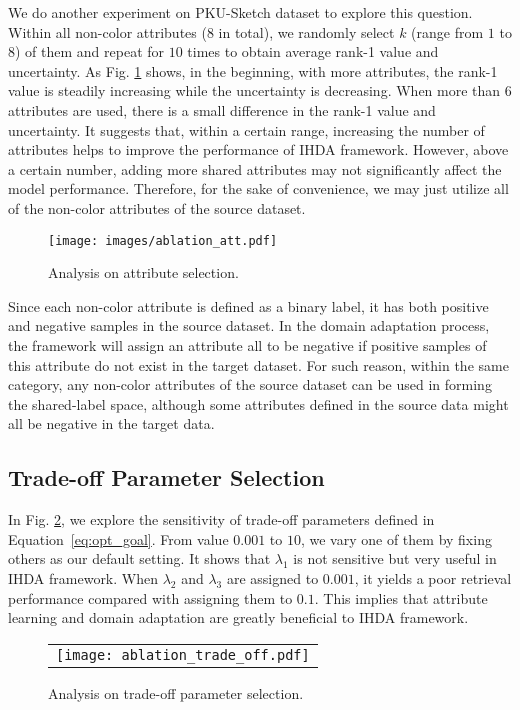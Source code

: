 \documentclass[journal]{IEEEtran}
\begin{document}
We do another experiment on PKU-Sketch dataset to explore this question. Within all non-color attributes ($8$ in total), we randomly select $k$ (range from $1$ to $8$) of them and repeat for $10$ times to obtain average rank-1 value and uncertainty. As Fig. \ref{fig:ablation_att} shows, 
in the beginning, with more attributes, the rank-1 value is steadily increasing while the uncertainty is decreasing. When more than $6$ attributes are used, there is a small difference in the rank-1 value and uncertainty. It suggests that, within a certain range, increasing the number of attributes helps to improve the performance of IHDA framework. However, above a certain number, adding more shared attributes may not significantly affect the model performance. Therefore, for the sake of convenience, we may just utilize all of the non-color attributes of the source dataset. 

\begin{figure}[h!]
\centering 
\texttt{[image: images/ablation\_att.pdf]}
\caption{Analysis on attribute selection.}
\label{fig:ablation_att}
\end{figure}


Since each non-color attribute is defined as a binary label, it has both positive and negative samples in the source dataset. In the domain adaptation process, the framework will assign an attribute all to be negative if positive samples of this attribute do not exist in the target dataset. For such reason, within the same category, any non-color attributes of the source dataset can be used in forming the shared-label space, although some attributes defined in the source data might all be negative in the target data.


\subsection{Trade-off Parameter Selection}
In Fig. \ref{fig:trade-off}, we explore the sensitivity of trade-off parameters defined in Equation~\ref{eq:opt_goal}. From value $0.001$ to $10$, we vary one of them by fixing others as our default setting. It shows that $\lambda_{1}$ is not sensitive but very useful in IHDA framework. When $\lambda_{2}$ and $\lambda_{3}$ are assigned to $0.001$, it yields a poor retrieval performance compared with assigning them to $0.1$. This implies that attribute learning and domain adaptation are greatly beneficial to IHDA framework.

\tabcolsep=3pt
\begin{figure}[h!]
\centering 
\begin{tabular}{c}
\texttt{[image: ablation\_trade\_off.pdf]} \\
\end{tabular}
\caption{Analysis on trade-off parameter selection.}
\label{fig:trade-off}
\end{figure}
\end{document}
